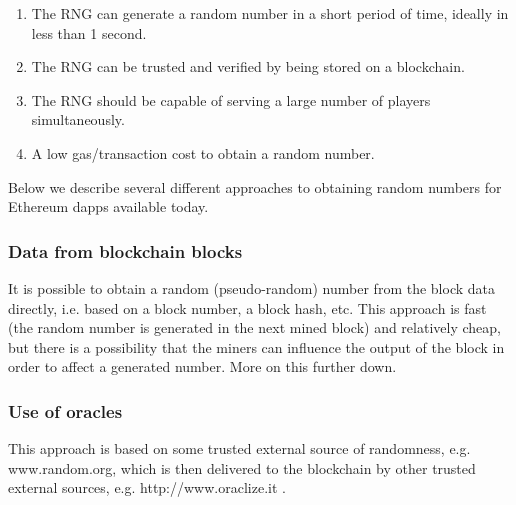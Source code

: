 \documentclass[12pt]{article}
\begin{document}
\begin{enumerate}
	\item The RNG can generate a random number in a short period of time, ideally in less than 1 second.\par

	\item The RNG can be trusted and verified by being stored on a blockchain.\par

	\item The RNG should be capable of serving a large number of players simultaneously.\par

	\item A low gas/transaction cost to obtain a random number.
\end{enumerate}\par

Below we describe several different approaches to obtaining random numbers for Ethereum dapps available today.\par


\vspace{\baselineskip}
\subsubsection{Data from blockchain blocks}\label{Data from blockchain blocks}  \par

It is possible to obtain a random (pseudo-random) number from the block data directly, i.e. based on a block number, a block hash, etc. This approach is fast (the random number is generated in the next mined block) and relatively cheap, but there is a possibility that the miners can influence the output of the block in order to affect a generated number. More on this further down.\par



\vspace{\baselineskip}
 \subsubsection{Use of oracles}\label{Use of oracles}  \par

This approach is based on some trusted external source of randomness, e.g. www.random.org, which is then delivered to the blockchain by other trusted external sources, e.g. http://www.oraclize.it  \cite{Oraclize_2017_May_18}.\par
\end{document}
